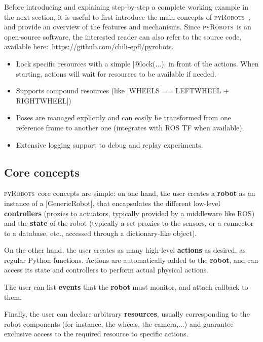 \documentclass[a4paper, 10pt, conference]{ieeeconf}      %
\newcommand{\pyRobots}{\textsc{pyRobots}\ }
\begin{document}
Before introducing and explaining step-by-step a complete working example in the
next section, it is useful to first introduce the main concepts of \pyRobots,
and provide an overview of the features and mechanisms. Since \pyRobots is an
open-source software, the interested reader can also refer to the source code,
available here:~\url{https://github.com/chili-epfl/pyrobots}.

\begin{itemize}
    \item Lock specific resources with a simple \python|@lock(...)| in front of the
        actions. When starting, actions will wait for resources to be
        available if needed.
    \item Supports compound resources (like \python|WHEELS == LEFTWHEEL + RIGHTWHEEL|)
    \item Poses are managed explicitly and can easily be
        transformed from one reference frame to another one
        (integrates with ROS TF when available).
    \item Extensive logging support to debug and replay
        experiments.
\end{itemize}

\subsection{Core concepts}

\pyRobots core concepts are simple: on one hand, the user creates a
\textbf{robot} as an instance of a \python|GenericRobot|, that encapsulates the
different low-level \textbf{controllers} (proxies to actuators, typically
provided by a middleware like ROS) and the \textbf{state} of the robot
(typically a set proxies to the sensors, or a connector to a database, etc.,
accessed through a dictionary-like object).

On the other hand, the user creates as many high-level \textbf{actions} as
desired, as regular Python functions. Actions are automatically added to the
\textbf{robot}, and can access its state and controllers to perform actual
physical actions.

The user can list \textbf{events} that the \textbf{robot} must monitor, and
attach callback to them.

Finally, the user can declare arbitrary \textbf{resources}, usually
corresponding to the robot components (for instance, the wheels, the camera,...)
and guarantee exclusive access to the required resource to specific actions.
\end{document}
